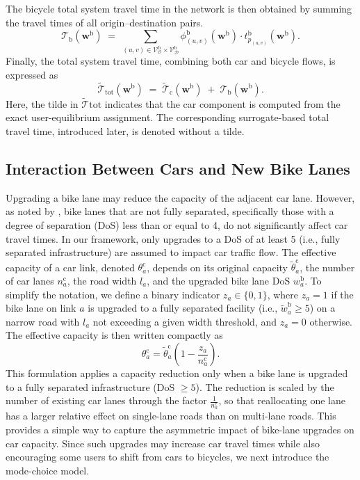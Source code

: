 \documentclass[lettersize,journal]{IEEEtran}
\begin{document}
The bicycle total system travel time in the network is then obtained by summing the
travel times of all origin–destination pairs.
\begin{equation}
    \mathcal{T}_\mathrm{b}(\boldsymbol{w}^\mathrm{b})
    \;=\;
    \sum_{(u,v) \in
    \mathcal{V}^\mathrm{b}_{\mathcal{O}} \times \mathcal{V}_{\mathcal{D}}^\mathrm{b}}
    \phi_{(u,v)}^{\mathrm{b}}(\boldsymbol{w}^\mathrm{b}) \cdot t_{p_{(u,v)}}^\mathrm{b}(\boldsymbol{w}^\mathrm{b}).
\end{equation}
Finally, the total system travel time, combining both car and bicycle flows,
is expressed as
\begin{equation}
    \tilde{\mathcal{T}}_{\mathrm{tot}}(\boldsymbol{w}^\mathrm{b})
    \;=\;
    \tilde{\mathcal{T}}_\mathrm{c}(\boldsymbol{w}^\mathrm{b})
    \;+\;
    \mathcal{T}_\mathrm{b}(\boldsymbol{w}^\mathrm{b}).
\end{equation}
Here, the tilde in $\tilde{\mathcal{T}}{\mathrm{tot}}$ indicates that the car component is computed from the exact user-equilibrium assignment. The corresponding surrogate-based total travel time, introduced later, is denoted without a tilde.
\subsection{Interaction Between Cars and New Bike Lanes}
Upgrading a bike lane may reduce the capacity of the adjacent car lane. However, as noted by \cite{nanayakkara2022safe}, bike lanes that are not fully separated, specifically those with a degree of separation (DoS) less than or equal to 4, do not significantly affect car travel times.  
In our framework, only upgrades to a DoS of at least 5 (i.e., fully separated infrastructure) are assumed to impact car traffic flow.
The effective capacity of a car link, denoted $\theta_a^\mathrm{c}$, depends on its original capacity $\tilde{\theta}_a^\mathrm{c}$, 
the number of car lanes $n_a^\mathrm{c}$, the road width $l_a$, and the upgraded bike lane DoS $w_a^\mathrm{b}$. 
To simplify the notation, we define a binary indicator $z_a \in \{0,1\}$, where $z_a = 1$ if the bike lane on link $a$ is upgraded to a fully separated facility (i.e., $\tilde{w}_a^{\mathrm{b}} \ge 5$) on a narrow road with $l_a$ not exceeding a given width threshold, and $z_a = 0$ otherwise.
The effective capacity is then written compactly as
\begin{equation}
\label{eq:effective_capacity}
    \theta_a^\mathrm{c}
    = \tilde{\theta}_a^\mathrm{c}\!\left(1 - \frac{z_a}{n_a^\mathrm{c}}\right).
\end{equation}
This formulation applies a capacity reduction only when a bike lane is upgraded to a fully separated infrastructure (DoS $\geq 5$). The reduction is scaled by the number of existing car lanes through the factor $\tfrac{1}{n_a^\mathrm{c}}$, so that reallocating one lane has a larger relative effect on single-lane roads than on multi-lane roads. This provides a simple way to capture the asymmetric impact of bike-lane upgrades on car capacity. Since such upgrades may increase car travel times while also encouraging some users to shift from cars to bicycles, we next introduce the mode-choice model.
\end{document}
